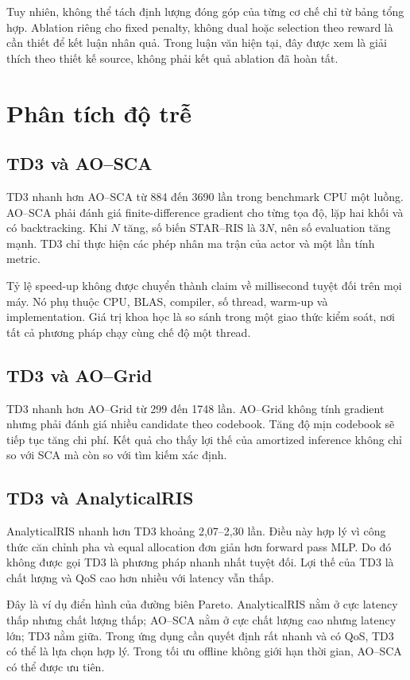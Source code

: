 Tuy nhiên, không thể tách định lượng đóng góp của từng cơ chế chỉ từ bảng tổng hợp. Ablation riêng cho fixed penalty, không dual hoặc selection theo reward là cần thiết để kết luận nhân quả. Trong luận văn hiện tại, đây được xem là giải thích theo thiết kế source, không phải kết quả ablation đã hoàn tất.

\section{Phân tích độ trễ}
\subsection{TD3 và AO--SCA}
TD3 nhanh hơn AO--SCA từ 884 đến 3690 lần trong benchmark CPU một luồng. AO--SCA phải đánh giá finite-difference gradient cho từng tọa độ, lặp hai khối và có backtracking. Khi $N$ tăng, số biến STAR--RIS là $3N$, nên số evaluation tăng mạnh. TD3 chỉ thực hiện các phép nhân ma trận của actor và một lần tính metric.

Tỷ lệ speed-up không được chuyển thành claim về millisecond tuyệt đối trên mọi máy. Nó phụ thuộc CPU, BLAS, compiler, số thread, warm-up và implementation. Giá trị khoa học là so sánh trong một giao thức kiểm soát, nơi tất cả phương pháp chạy cùng chế độ một thread.

\subsection{TD3 và AO--Grid}
TD3 nhanh hơn AO--Grid từ 299 đến 1748 lần. AO--Grid không tính gradient nhưng phải đánh giá nhiều candidate theo codebook. Tăng độ mịn codebook sẽ tiếp tục tăng chi phí. Kết quả cho thấy lợi thế của amortized inference không chỉ so với SCA mà còn so với tìm kiếm xác định.

\subsection{TD3 và AnalyticalRIS}
AnalyticalRIS nhanh hơn TD3 khoảng 2,07--2,30 lần. Điều này hợp lý vì công thức căn chỉnh pha và equal allocation đơn giản hơn forward pass MLP. Do đó không được gọi TD3 là phương pháp nhanh nhất tuyệt đối. Lợi thế của TD3 là chất lượng và QoS cao hơn nhiều với latency vẫn thấp.

Đây là ví dụ điển hình của đường biên Pareto. AnalyticalRIS nằm ở cực latency thấp nhưng chất lượng thấp; AO--SCA nằm ở cực chất lượng cao nhưng latency lớn; TD3 nằm giữa. Trong ứng dụng cần quyết định rất nhanh và có QoS, TD3 có thể là lựa chọn hợp lý. Trong tối ưu offline không giới hạn thời gian, AO--SCA có thể được ưu tiên.

